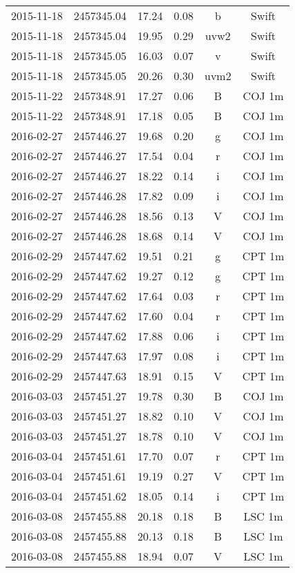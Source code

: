 \begin{table}
\begin{tabular}{cccccc}
2015-11-18 & 2457345.04 & 17.24 & 0.08 & b & Swift \\
2015-11-18 & 2457345.04 & 19.95 & 0.29 & uvw2 & Swift \\
2015-11-18 & 2457345.05 & 16.03 & 0.07 & v & Swift \\
2015-11-18 & 2457345.05 & 20.26 & 0.30 & uvm2 & Swift \\
2015-11-22 & 2457348.91 & 17.27 & 0.06 & B & COJ 1m \\
2015-11-22 & 2457348.91 & 17.18 & 0.05 & B & COJ 1m \\
2016-02-27 & 2457446.27 & 19.68 & 0.20 & g & COJ 1m \\
2016-02-27 & 2457446.27 & 17.54 & 0.04 & r & COJ 1m \\
2016-02-27 & 2457446.27 & 18.22 & 0.14 & i & COJ 1m \\
2016-02-27 & 2457446.28 & 17.82 & 0.09 & i & COJ 1m \\
2016-02-27 & 2457446.28 & 18.56 & 0.13 & V & COJ 1m \\
2016-02-27 & 2457446.28 & 18.68 & 0.14 & V & COJ 1m \\
2016-02-29 & 2457447.62 & 19.51 & 0.21 & g & CPT 1m \\
2016-02-29 & 2457447.62 & 19.27 & 0.12 & g & CPT 1m \\
2016-02-29 & 2457447.62 & 17.64 & 0.03 & r & CPT 1m \\
2016-02-29 & 2457447.62 & 17.60 & 0.04 & r & CPT 1m \\
2016-02-29 & 2457447.62 & 17.88 & 0.06 & i & CPT 1m \\
2016-02-29 & 2457447.63 & 17.97 & 0.08 & i & CPT 1m \\
2016-02-29 & 2457447.63 & 18.91 & 0.15 & V & CPT 1m \\
2016-03-03 & 2457451.27 & 19.78 & 0.30 & B & COJ 1m \\
2016-03-03 & 2457451.27 & 18.82 & 0.10 & V & COJ 1m \\
2016-03-03 & 2457451.27 & 18.78 & 0.10 & V & COJ 1m \\
2016-03-04 & 2457451.61 & 17.70 & 0.07 & r & CPT 1m \\
2016-03-04 & 2457451.61 & 19.19 & 0.27 & V & CPT 1m \\
2016-03-04 & 2457451.62 & 18.05 & 0.14 & i & CPT 1m \\
2016-03-08 & 2457455.88 & 20.18 & 0.18 & B & LSC 1m \\
2016-03-08 & 2457455.88 & 20.13 & 0.18 & B & LSC 1m \\
2016-03-08 & 2457455.88 & 18.94 & 0.07 & V & LSC 1m \\

\end{tabular}
\end{table}
